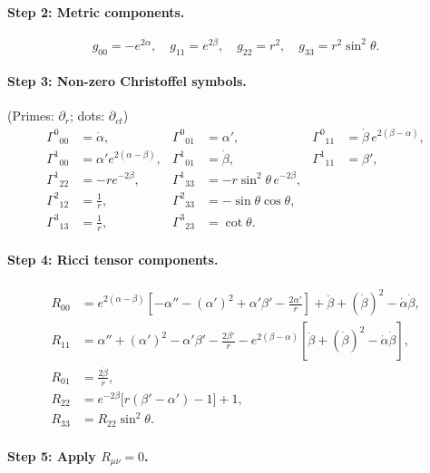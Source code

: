 \documentclass[12pt,a4paper]{article}
\theoremstyle{plain}
\theoremstyle{definition}
\theoremstyle{remark}
\begin{document}
\paragraph{Step 2: Metric components.}
\[
  g_{00}=-e^{2\alpha},\quad g_{11}=e^{2\beta},\quad g_{22}=r^2,\quad g_{33}=r^2\sin^2\theta.
\]

\paragraph{Step 3: Non-zero Christoffel symbols.}
(Primes: $\partial_r$; dots: $\partial_{ct}$)
\begin{align*}
  \Gamma^0{}_{00} &= \dot\alpha, & \Gamma^0{}_{01} &= \alpha', & \Gamma^0{}_{11} &= \dot\beta\,e^{2(\beta-\alpha)},\\
  \Gamma^1{}_{00} &= \alpha'e^{2(\alpha-\beta)}, & \Gamma^1{}_{01} &= \dot\beta, & \Gamma^1{}_{11} &= \beta',\\
  \Gamma^1{}_{22} &= -re^{-2\beta}, & \Gamma^1{}_{33} &= -r\sin^2\theta\,e^{-2\beta},\\
  \Gamma^2{}_{12} &= \tfrac{1}{r}, & \Gamma^2{}_{33} &= -\sin\theta\cos\theta,\\
  \Gamma^3{}_{13} &= \tfrac{1}{r}, & \Gamma^3{}_{23} &= \cot\theta.
\end{align*}

\paragraph{Step 4: Ricci tensor components.}
\begin{align}
  R_{00} &= e^{2(\alpha-\beta)}\!\left[-\alpha''-(\alpha')^2+\alpha'\beta'-\frac{2\alpha'}{r}\right]
            + \ddot\beta+(\dot\beta)^2-\dot\alpha\dot\beta, \label{eq:R00}\\
  R_{11} &= \alpha''+(\alpha')^2-\alpha'\beta'-\frac{2\beta'}{r}
            - e^{2(\beta-\alpha)}\!\left[\ddot\beta+(\dot\beta)^2-\dot\alpha\dot\beta\right], \label{eq:R11}\\
  R_{01} &= \frac{2\dot\beta}{r}, \label{eq:R01}\\
  R_{22} &= e^{-2\beta}\bigl[r(\beta'-\alpha')-1\bigr]+1, \label{eq:R22}\\
  R_{33} &= R_{22}\sin^2\theta.
\end{align}

\paragraph{Step 5: Apply $R_{\mu\nu}=0$.}
\end{document}
